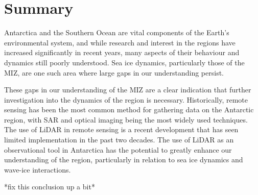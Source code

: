 \section{Summary}
\label{sec:ch2.section6}

Antarctica and the Southern Ocean are vital components of the Earth's environmental system, and while research and interest in the regions have increased significantly in recent years, many aspects of their behaviour and dynamics still poorly understood. Sea ice dynamics, particularly those of the \ac{MIZ}, are one such area where large gaps in our understanding persist. 

These gaps in our understanding of the \ac{MIZ} are a clear indication that further investigation into the dynamics of the region is necessary. Historically, remote sensing has been the most common method for gathering data on the Antarctic region, with \ac{SAR} and optical imaging being the most widely used techniques. The use of \ac{LiDAR} in remote sensing is a recent development that has seen limited implementation in the past two decades. The use of \ac{LiDAR} as an observational tool in Antarctica has the potential to greatly enhance our understanding of the region, particularly in relation to sea ice dynamics and wave-ice interactions.

*fix this conclusion up a bit*

